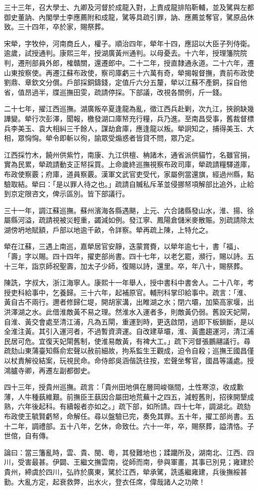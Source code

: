 \begin{pinyinscope}
三十三年，召大學士、九卿及河督於成龍入對，上責成龍排陷靳輔，並及騭與左都御史董訥、內閣學士李應薦附和成龍，騭等具疏引罪，訥、應薦並奪官，騭原品休致。三十四年，卒於家，賜祭葬。

宋犖，字牧仲，河南商丘人，權子。順治四年，犖年十四，應詔以大臣子列侍衛。逾歲，試授通判。康熙三年，授湖廣黃州通判。以母憂去。十六年，授理籓院院判，遷刑部員外郎，榷贛關，還遷郎中。二十二年，授直隸通永道。二十六年，遷山東按察使。再遷江蘇布政使，察司庫虧三十六萬有奇，犖揭報督撫，責前布政使劉鼎、章欽文分償。戶部採銅鑄錢，定值斤六分五釐，犖以江蘇不產銅，採自他省，值昂過半，牒巡撫田雯，疏請停採。下部議，改視各關例，斤一錢。

二十七年，擢江西巡撫。湖廣叛卒夏逢龍為亂，徵江西兵赴剿，次九江，挾餉缺幾譁變。犖行次彭澤，聞報，檄發湖口庫帑充行糧，兵乃進。至南昌受事，舊裁督標兵李美玉、袁大相糾三千餘人，謀劫倉庫，應逢龍以叛。犖詗知之，捕得美玉、大相，眾恟恟。犖令即斬以徇，諭眾受煽惑者皆貸不問，眾乃定。

江西採竹木，饒州供紫竹，南康、九江供檀、柟諸木，通省派供貓竹，名雖官捐，實為民累，犖疏請動支正帑採買。上命歲終巡撫視察布政司庫，犖疏請糧驛道庫，布政使察覈；府庫，道員察覈。漢軍文武官吏受代，家屬例當還旗，經過州縣，點驗取結。犖曰：「是以罪人待之也。」疏請自贓私斥革並侵挪帑項解部比追外，止給到京定限咨文，俾示區別。皆下部議行。

三十一年，調江蘇巡撫。蘇州濱海各縣遇颶，上元、六合諸縣發山水，淮、揚、徐屬縣河溢，疏請視被災輕重，蠲減如例。發江寧、鳳陽倉儲米麥散賑。別疏請除太湖傍坍地賦額，戶部以地逾千畝，令詳察。犖再疏上陳，上特允之。

犖在江蘇，三遇上南巡，嘉犖居官安靜，迭蒙賞賚，以犖年逾七十，書「福」、「壽」字以賜。四十四年，擢吏部尚書。四十七年，以老乞罷，瀕行，賜以詩。五十三年，詣京師祝聖壽，加太子少師，復賜以詩，還里。卒，年八十，賜祭葬。

陳詵，字叔大，浙江海寧人。康熙十一年舉人，授中書科中書舍人。二十八年，考授吏科給事中，乞養歸。三十六年，起補原官。輔刑科掌印給事中。疏言：「淮、黃自古不兩行。邇者修歸仁堤，開胡家溝，出睢湖之水；閉六壩，加築高家堰，出洪澤湖之水。此借淮敵黃不易之理。然淮水入運者多，則敵黃仍弱。舊設天妃閘，自淮、黃交會處至清江浦，凡為五閘，重運到時，更迭啟閉，過即下板鎖斷，是以全淮注黃。其引入運河者，不過暫資濟運。自改建草壩，淮、黃盡趨運河，清江浦民居可危。宜復天妃閘舊制，使淮易敵黃，有裨大工。」疏下河督張鵬翮議行。尋疏劾山東蒲臺知縣俞宏聲以赦前細故，拘系監生王觀成，迫令自殺；巡撫王國昌僅以杖責解役結案，玩視民命。命侍郎吳涵偕詵往按，宏聲坐奪官，國昌等議處。授鴻臚寺卿，再遷左副都御史。

四十三年，授貴州巡撫。疏言：「貴州田地俱在層岡峻嶺間，土性寒涼，收成歉薄，人牛種蓺維艱。前撫臣王蓺因合屬田地荒蕪十之四五，減輕舊則，招徠開墾成熟，六年後起科。有續報者亦如之。」疏下部，如所請。四十七年，調湖北。疏劾布政使王毓賢虧帑，命解任。尋以盤驗已完，奏免其罪。五十年，擢工部尚書。五十二年，調禮部。五十八年，乞休，命致仕。六十一年，卒，賜祭葬，謚清恪。子世倌，自有傳。

論曰：當三籓亂時，雲、貴、閩、粵，其發難地也；蹂躪所及，湖南北、江西、四川，受害最甚。伊闢、王繼文撫雲南，從師而南，參與軍畫，其事已別見；雍建於貴州，締虞於四川，弘祚於廣東，騭於江西，犖承騭，詵遙繼雍建，兵後撫綏甚勤。大亂方定，起衰救弊，出水火，登衣任席，偉哉諸人之功歟！


\end{pinyinscope}